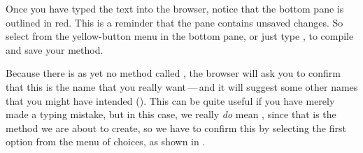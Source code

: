 \documentclass[a4paper,10pt,twoside]{book}
\begin{document}
Once you have typed the text into the browser, notice that the bottom pane is outlined in red.  This is a reminder that the pane contains unsaved changes.
So select  from the yellow-button menu in the bottom pane, or just type , to compile and save your method.

Because there is as yet no method called , the browser will ask you to confirm that this is the name that you really want\,---\,and it will suggest some other names that you might have intended ().
This can be quite useful if you have merely made a typing mistake, but in this case, we really \emph{do} mean , since that is the method we are about to create, so we have to confirm this by selecting the first option from the menu of choices, as shown in . 

\end{document}
